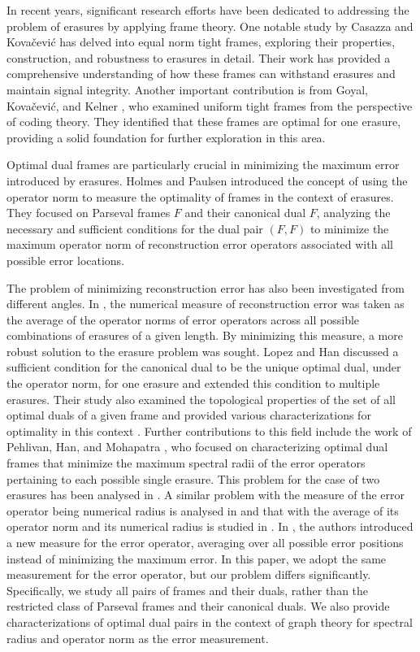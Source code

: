 \documentclass[final,1p,times]{elsarticle}
\begin{document}
	In recent years, significant research efforts have been dedicated to addressing the problem of erasures by applying frame theory. One notable study by Casazza and Kovačević \cite{casa2} has delved into equal norm tight frames, exploring their properties, construction, and robustness to erasures in detail. Their work has provided a comprehensive understanding of how these frames can withstand erasures and maintain signal integrity. Another important contribution is from Goyal, Kovačević, and Kelner \cite{goya}, who examined uniform tight frames from the perspective of coding theory. They identified that these frames are optimal for one erasure, providing a solid foundation for further exploration in this area.
	
	Optimal dual frames are particularly crucial in minimizing the maximum error introduced by erasures. Holmes and Paulsen \cite{holm} introduced the concept of using the operator norm to measure the optimality of frames in the context of erasures. They focused on Parseval frames $F$ and their canonical dual $F$, analyzing the necessary and sufficient conditions for the dual pair $(F, F)$ to minimize the maximum operator norm of reconstruction error operators associated with all possible error locations.
	
	The problem of minimizing reconstruction error has also been investigated from different angles. In \cite{bodm1}, the numerical measure of reconstruction error was taken as the average of the operator norms of error operators across all possible combinations of erasures of a given length. By minimizing this measure, a more robust solution to the erasure problem was sought. Lopez and Han \cite{jerr} discussed a sufficient condition for the canonical dual to be the unique optimal dual, under the operator norm, for one erasure and extended this condition to multiple erasures. Their study also examined the topological properties of the set of all optimal duals of a given frame and provided various characterizations for optimality in this context \cite{jins}.	Further contributions to this field include the work of Pehlivan, Han, and Mohapatra \cite{sali}, who focused on characterizing optimal dual frames that minimize the maximum spectral radii of the error operators pertaining to each possible single erasure. This problem for the case of two erasures has been analysed in \cite{peh, dev}. A similar problem with the measure of the error operator being numerical radius is analysed in \cite{ara} and that with the average of its operator norm and its numerical radius is studied in \cite{deep}. In \cite{bodm1}, the authors introduced a new measure for the error operator, averaging over all possible error positions instead of minimizing the maximum error. In this paper, we adopt the same measurement for the error operator, but our problem differs significantly. Specifically, we study all pairs of frames and their duals, rather than the restricted class of Parseval frames and their canonical duals. We also provide characterizations of optimal dual pairs in the context of graph theory for spectral radius and operator norm as the error measurement.
	
\end{document}
